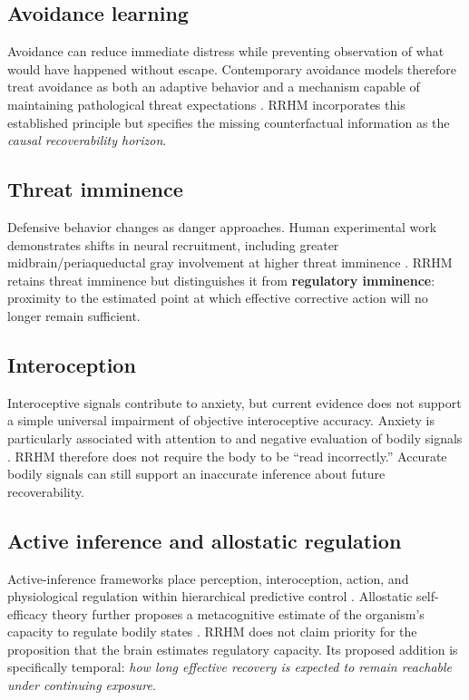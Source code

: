 \documentclass[11pt]{article}
\begin{document}
\subsection{Avoidance learning}

Avoidance can reduce immediate distress while preventing observation of what would have happened without escape. Contemporary avoidance models therefore treat avoidance as both an adaptive behavior and a mechanism capable of maintaining pathological threat expectations \cite{krypotos2015,pittig2018}. RRHM incorporates this established principle but specifies the missing counterfactual information as the \emph{causal recoverability horizon}.

\subsection{Threat imminence}

Defensive behavior changes as danger approaches. Human experimental work demonstrates shifts in neural recruitment, including greater midbrain/periaqueductal gray involvement at higher threat imminence \cite{mobbs2007}. RRHM retains threat imminence but distinguishes it from \textbf{regulatory imminence}: proximity to the estimated point at which effective corrective action will no longer remain sufficient.

\subsection{Interoception}

Interoceptive signals contribute to anxiety, but current evidence does not support a simple universal impairment of objective interoceptive accuracy. Anxiety is particularly associated with attention to and negative evaluation of bodily signals \cite{jenkinson2024,clemente2024}. RRHM therefore does not require the body to be ``read incorrectly.'' Accurate bodily signals can still support an inaccurate inference about future recoverability.

\subsection{Active inference and allostatic regulation}

Active-inference frameworks place perception, interoception, action, and physiological regulation within hierarchical predictive control \cite{paulus2019}. Allostatic self-efficacy theory further proposes a metacognitive estimate of the organism's capacity to regulate bodily states \cite{stephan2016}. RRHM does not claim priority for the proposition that the brain estimates regulatory capacity. Its proposed addition is specifically temporal: \emph{how long effective recovery is expected to remain reachable under continuing exposure}.
\end{document}
